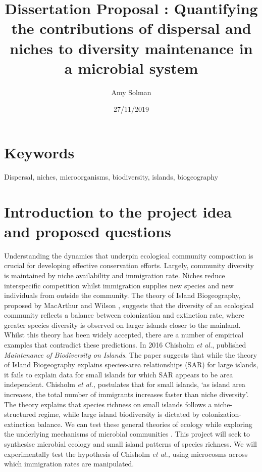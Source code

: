 \documentclass[11pt]{article}
\title{Dissertation Proposal : Quantifying the contributions of dispersal and niches to diversity maintenance in a microbial system}
\author{Amy Solman}
\date{27/11/2019}
\begin{document}
\linenumbers
  
\linenumbers  
  \section{Keywords}
  Dispersal, niches, microorganisms, biodiversity, islands, biogeography

  \section{Introduction to the project idea and proposed questions}
  Understanding the dynamics that underpin ecological community composition is crucial for developing effective conservation efforts. Largely, community diversity is maintained by niche availability and immigration rate. Niches reduce interspecific competition whilst immigration supplies new species and new individuals from outside the community. The theory of Island Biogeography, proposed by MacArthur and Wilson   \cite{wilson1967theory}, suggests that the diversity of an ecological community reflects a balance between colonization and extinction rate, where greater species diversity is observed on larger islands closer to the mainland. Whilst this theory has been widely accepted, there are a number of empirical examples that contradict these predictions\cite{sfenthourakis2009habitat}\cite{triantis2006re}. In 2016 Chisholm \textit{et al.}, published \textit{Maintenance of Biodiversity on Islands}\cite{chisholm2016maintenance}. The paper suggests that while the theory of Island Biogeography explains species-area relationships (SAR) for large islands, it fails to explain data for small islands for which SAR appears to be area independent. Chisholm \textit{et al.,} postulates that for small islands, ‘as island area increases, the total number of immigrants increases faster than niche diversity’. The theory explains that species richness on small islands follows a niche-structured regime, while large island biodiversity is dictated by colonization-extinction balance. We can test these general theories of ecology while exploring the underlying mechanisms of microbial communities \cite{van2008islands}. This project will seek to synthesise microbial ecology and small island patterns of species richness. We will experimentally test the hypothesis of Chisholm \textit{et al.,} using microcosms across which immigration rates are manipulated.
  
\end{document}
